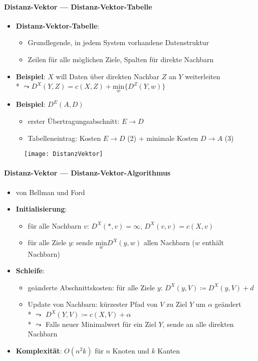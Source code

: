 \paragraph{Distanz-Vektor --- Distanz-Vektor-Tabelle}
\begin{itemize}
	\item \textbf{Distanz-Vektor-Tabelle}:
	\begin{itemize}
    \item Grundlegende, in jedem System vorhandene Datenstruktur
    \item Zeilen für alle möglichen Ziele, Spalten für direkte Nachbarn
  \end{itemize}
  \item \textbf{Beispiel}: \( X \) will Daten über direkten Nachbar \( Z \) an \( Y \) weiterleiten \\* \( \leadsto D^X(Y,Z) = c(X,Z) + \underset{w}{\text{min}}\{ D^Z(Y,w) \} \)
  \item \textbf{Beispiel}: \( D^E(A,D) \)
  \begin{itemize}
    \item erster Übertragungsabschnitt: \( E \to D \)
    \item Tabelleneintrag: Kosten \( E \to D \) (2) + minimale Kosten \( D \to A \) (3)
  \end{itemize}
\end{itemize}
\begin{figure}[H]\centering\label{DistanzVektor}\texttt{[image: DistanzVektor]}\end{figure}

\paragraph{Distanz-Vektor --- Distanz-Vektor-Algorithmus}
\begin{itemize}
  \item von Bellman und Ford
  \item \textbf{Initialisierung}:
  \begin{itemize}
    \item für alle Nachbarn \( v \): \( D^X(*,v) = \infty \), \( D^X(v,v) = c(X,v) \)
    \item für alle Ziele \( y \): sende \( \underset{w}{\text{min}}D^X(y,w) \) allen Nachbarn (\( w \) enthält Nachbarn)
  \end{itemize}
  \item \textbf{Schleife}:
  \begin{itemize}
    \item geänderte Abschnittskosten: für alle Ziele \( y \): \( D^X(y,V) \coloneqq D^X(y,V) + d \)
    \item Update von Nachbarn: kürzester Pfad von \( V \) zu Ziel \( Y \) um \( \alpha \) geändert \\* \( \leadsto \) \( D^X(Y,V) \coloneqq c(X,V) + \alpha \) \\* \( \leadsto \) Falls neuer Minimalwert für ein Ziel \( Y \),  sende an alle direkten Nachbarn
  \end{itemize}
  \item \textbf{Komplexität}: \( O(n^2k) \) für \( n \) Knoten und \( k \) Kanten
\end{itemize}

